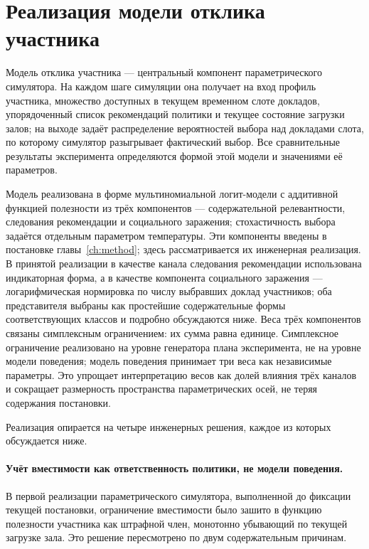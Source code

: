 \section{Реализация модели отклика участника}
\label{sec:3-3}

Модель отклика участника --- центральный компонент параметрического симулятора. На каждом шаге симуляции она получает на вход профиль участника, множество доступных в текущем временном слоте докладов, упорядоченный список рекомендаций политики и текущее состояние загрузки залов; на выходе задаёт распределение вероятностей выбора над докладами слота, по которому симулятор разыгрывает фактический выбор. Все сравнительные результаты эксперимента определяются формой этой модели и значениями её параметров.

Модель реализована в форме мультиномиальной логит-модели с аддитивной функцией полезности из трёх компонентов --- содержательной релевантности, следования рекомендации и социального заражения; стохастичность выбора задаётся отдельным параметром температуры. Эти компоненты введены в постановке главы~\ref{ch:method}; здесь рассматривается их инженерная реализация. В принятой реализации в качестве канала следования рекомендации использована индикаторная форма, а в качестве компонента социального заражения --- логарифмическая нормировка по числу выбравших доклад участников; оба представителя выбраны как простейшие содержательные формы соответствующих классов и подробно обсуждаются ниже. Веса трёх компонентов связаны симплексным ограничением: их сумма равна единице. Симплексное ограничение реализовано на уровне генератора плана эксперимента, не на уровне модели поведения; модель поведения принимает три веса как независимые параметры. Это упрощает интерпретацию весов как долей влияния трёх каналов и сокращает размерность пространства параметрических осей, не теряя содержания постановки.

Реализация опирается на четыре инженерных решения, каждое из которых обсуждается ниже.

\paragraph{Учёт вместимости как ответственность политики, не модели поведения.}
В первой реализации параметрического симулятора, выполненной до фиксации текущей постановки, ограничение вместимости было зашито в функцию полезности участника как штрафной член, монотонно убывающий по текущей загрузке зала. Это решение пересмотрено по двум содержательным причинам.

